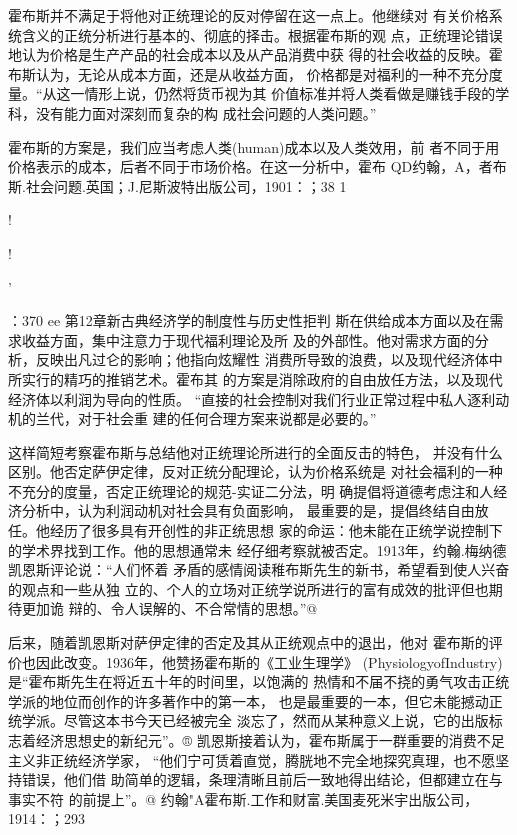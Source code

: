 霍布斯并不满足于将他对正统理论的反对停留在这一点上。他继续对
有关价格系统含义的正统分析进行基本的、彻底的择击。根据霍布斯的观
点，正统理论错误地认为价格是生产产品的社会成本以及从产品消费中获
得的社会收益的反映。霍布斯认为，无论从成本方面，还是从收益方面，
价格都是对福利的一种不充分度量。“从这一情形上说，仍然将货币视为其
价值标准并将人类看做是赚钱手段的学科，没有能力面对深刻而复杂的构
成社会问题的人类问题。”%

霍布斯的方案是，我们应当考虑人类(human)成本以及人类效用，前
者不同于用价格表示的成本，后者不同于市场价格。在这一分析中，霍布
QD约翰，A，者布斯.社会问题.英国；J.尼斯波特出版公司，1901：；38
1

!

!

'

：370
ee
第12章新古典经济学的制度性与历史性拒判
斯在供给成本方面以及在需求收益方面，集中注意力于现代福利理论及所
及的外部性。他对需求方面的分析，反映出凡过仑的影响；他指向炫耀性
消费所导致的浪费，以及现代经济体中所实行的精巧的推销艺术。霍布其
的方案是消除政府的自由放任方法，以及现代经济体以利润为导向的性质。
“直接的社会控制对我们行业正常过程中私人逐利动机的兰代，对于社会重
建的任何合理方案来说都是必要的。”

这样简短考察霍布斯与总结他对正统理论所进行的全面反击的特色，
并没有什么区别。他否定萨伊定律，反对正统分配理论，认为价格系统是
对社会福利的一种不充分的度量，否定正统理论的规范-实证二分法，明
确提倡将道德考虑注和人经济分析中，认为利润动机对社会具有负面影响，
最重要的是，提倡终结自由放任。他经历了很多具有开创性的非正统思想
家的命运：他未能在正统学说控制下的学术界找到工作。他的思想通常未
经仔细考察就被否定。1913年，约翰.梅纳德凯恩斯评论说：“人们怀着
矛盾的感情阅读稚布斯先生的新书，希望看到使人兴奋的观点和一些从独
立的、个人的立场对正统学说所进行的富有成效的批评但也期待更加诡
辩的、令人误解的、不合常情的思想。”@

后来，随着凯恩斯对萨伊定律的否定及其从正统观点中的退出，他对
霍布斯的评价也因此改变。1936年，他赞扬霍布斯的《工业生理学》
(PhysiologyofIndustry)是“霍布斯先生在将近五十年的时间里，以饱满的
热情和不届不挠的勇气攻击正统学派的地位而创作的许多著作中的第一本，
也是最重要的一本，但它未能撼动正统学派。尽管这本书今天已经被完全
淡忘了，然而从某种意义上说，它的出版标志着经济思想史的新纪元”。®
凯恩斯接着认为，霍布斯属于一群重要的消费不足主义非正统经济学家，
“他们宁可赁着直觉，腾胱地不完全地探究真理，也不愿坚持错误，他们借
助简单的逻辑，条理清晰且前后一致地得出结论，但都建立在与事实不符
的前提上”。@
约翰"A霍布斯.工作和财富.美国麦死米宇出版公司，1914：；293

